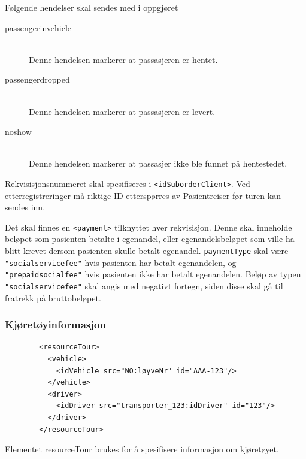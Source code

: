 \documentclass[a4paper,titlepage,norsk,11pt]{article}
\begin{document}
Følgende hendelser skal sendes med i oppgjøret

\begin{description}

	\item[passengerinvehicle] \hfill \\
	Denne hendelsen markerer at passasjeren er hentet.

	\item[passengerdropped] \hfill \\
	Denne hendelsen markerer at passasjeren er levert.

	\item[noshow] \hfill \\
	Denne hendelsen markerer at passasjer ikke ble funnet på hentestedet.

\end{description}

Rekvisisjonsnummeret skal spesifiseres i \lstinline{<idSuborderClient>}. Ved etterregistreringer må riktige ID etterspørres av Pasientreiser før turen kan sendes inn.

Det skal finnes en \lstinline{<payment>} tilknyttet hver rekvisisjon. Denne skal inneholde beløpet som pasienten betalte i egenandel, eller egenandelsbeløpet som ville ha blitt krevet dersom pasienten skulle betalt egenandel. \lstinline{paymentType} skal være \lstinline{"socialservicefee"} hvis pasienten har betalt egenandelen, og \lstinline{"prepaidsocialfee"} hvis pasienten ikke har betalt egenandelen. Beløp av typen \lstinline{"socialservicefee"} skal angis med negativt fortegn, siden disse skal gå til fratrekk på bruttobeløpet.

\subsubsection{Kjøretøyinformasjon}

\begin{lstlisting}
        <resourceTour>
          <vehicle>
            <idVehicle src="NO:løyveNr" id="AAA-123"/>
          </vehicle>
          <driver>
            <idDriver src="transporter_123:idDriver" id="123"/>
          </driver>
        </resourceTour>
\end{lstlisting}

Elementet resourceTour brukes for å spesifisere informasjon om kjøretøyet.
\end{document}
